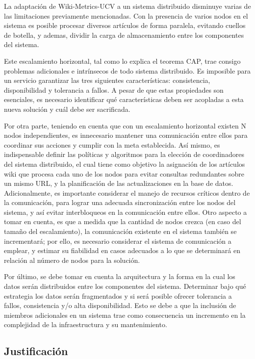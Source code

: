 La adaptación de Wiki-Metrics-UCV a un sistema distribuido disminuye varias de las limitaciones previamente
mencionadas. Con la presencia de varios nodos en el sistema es posible procesar diversos
artículos de forma paralela, evitando cuellos de botella, y ademas, dividir la carga de almacenamiento
entre los componentes del sistema.

Este escalamiento horizontal, tal como lo explica el teorema CAP\cite{6}, trae consigo problemas
adicionales e  intrínsecos de todo sistema distribuido. Es imposible para un servicio garantizar las tres
siguientes características: consistencia, disponibilidad y tolerancia a fallos. A pesar de que estas
propiedades son esenciales, es necesario identificar qué características deben ser acopladas a
esta nueva solución y cuál debe ser sacrificada.

Por otra parte, teniendo en cuenta que con un escalamiento horizontal existen N
nodos independientes, es innecesario mantener una comunicación entre ellos para
coordinar sus acciones y cumplir con la meta establecida. Así mismo, es indispensable
definir las políticas y algoritmos para la elección de coordinadores del sistema
distribuido, el cual tiene como objetivo la asignación de los artículos wiki que procesa
cada uno de los nodos para evitar consultas redundantes sobre un mismo URL, y la
planificación de las actualizaciones en la base de datos. Adicionalmente, es importante
considerar el manejo de recursos críticos dentro de la comunicación, para lograr una
adecuada sincronización entre los nodos del sistema, y así evitar interbloqueos en la
comunicación entre ellos. Otro aspecto a tomar en cuenta, es que a medida que la
cantidad de nodos crezca (en caso del tamaño del escalamiento), la comunicación
existente en el sistema también se incrementará; por ello, es necesario considerar el
sistema de comunicación a emplear, y estimar su fiabilidad en casos adecuados a lo que
se determinará en relación al número de nodos para la solución.

Por último, se debe tomar en cuenta la arquitectura y la forma en la cual los datos
serán distribuidos entre los componentes del sistema. Determinar bajo qué estrategia
los datos serán fragmentados y si será posible ofrecer tolerancia a fallos, consistencia y/o alta
disponibilidad. Esto se debe a que la inclusión de miembros adicionales en un sistema trae
como consecuencia un incremento en la complejidad de la infraestructura y su mantenimiento.

\subsection{Justificación}

